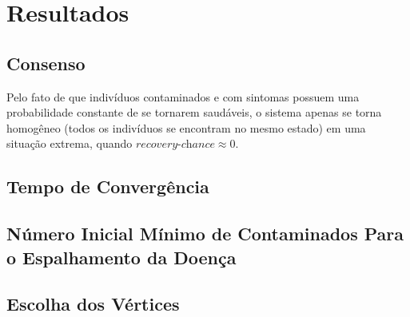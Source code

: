 \documentclass{article}
\begin{document}
\section{Resultados}
\subsection{Consenso}
Pelo fato de que indivíduos contaminados e com sintomas possuem uma probabilidade constante de se tornarem saudáveis, o sistema apenas se torna homogêneo (todos os indivíduos se encontram no mesmo estado) em uma situação extrema, quando $\textit{recovery-chance} \approx 0$.

\subsection{Tempo de Convergência}

\subsection{Número Inicial Mínimo de Contaminados Para o Espalhamento da Doença}

\subsection{Escolha dos Vértices}







\clearpage
 
\end{document}
